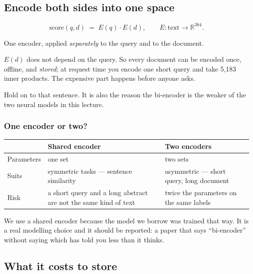 \documentclass[11pt,a4paper]{article}
\begin{document}
\subsection{Encode both sides into one space}

\[
  \text{score}(q,d) \;=\; E(q)\cdot E(d),
  \qquad E : \text{text} \to \mathbb{R}^{384}.
\]

One encoder, applied \emph{separately} to the query and to the document.

\begin{keybox}[title={Why ``separately'' is the whole design}]
$E(d)$ does not depend on the query. So every document can be encoded once,
offline, and \emph{stored}; at request time you encode one short query and take
5{,}183 inner products. The expensive part happens before anyone asks.

Hold on to that sentence. It is also the reason the bi-encoder is the weaker of
the two neural models in this lecture.
\end{keybox}

\subsubsection{One encoder or two?}

\begin{center}
\small
\begin{tabular}{p{}p{}p{}}
\toprule
 & \textbf{Shared encoder} & \textbf{Two encoders} \\
\midrule
Parameters & one set & two sets \\
Suits & symmetric tasks --- sentence similarity & asymmetric --- short query,
long document \\
Risk & a short query and a long abstract are not the same kind of text & twice
the parameters on the same labels \\
\bottomrule
\end{tabular}
\end{center}

We use a shared encoder because the model we borrow was trained that way. It is
a real modelling choice and it should be reported: a paper that says
``bi-encoder'' without saying which has told you less than it thinks.

\subsection{What it costs to store}
\end{document}
